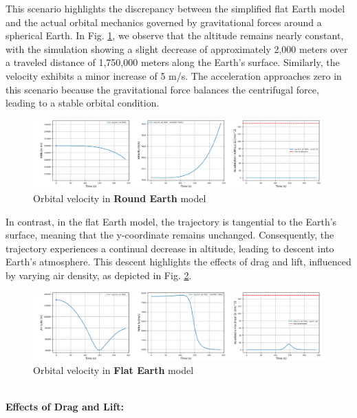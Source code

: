 \documentclass[runningheads]{llncs}
\begin{document}
This scenario highlights the discrepancy between the simplified flat Earth model and the actual orbital mechanics governed by gravitational forces around a spherical Earth. In Fig. \ref{orbit_round_earth}, we observe that the altitude remains nearly constant, with the simulation showing a slight decrease of approximately 2,000 meters over a traveled distance of 1,750,000 meters along the Earth's surface. Similarly, the velocity exhibits a minor increase of 5 m/s. The acceleration approaches zero in this scenario because the gravitational force balances the centrifugal force, leading to a stable orbital condition.


\begin{figure}
\centering
\includegraphics[width=1\textwidth]{images/orbit_round_earth.png}
\caption{Orbital velocity in \textbf{Round Earth} model} \label{orbit_round_earth}
\end{figure}

In contrast, in the flat Earth model, the trajectory is tangential to the Earth's surface, meaning that the y-coordinate remains unchanged. Consequently, the trajectory experiences a continual decrease in altitude, leading to descent into Earth's atmosphere. This descent highlights the effects of drag and lift, influenced by varying air density, as depicted in Fig. \ref{orbit_flat_earth}.

\begin{figure}
\centering
\includegraphics[width=1\textwidth]{images/orbit_flat_earth.png}
\caption{Orbital velocity in \textbf{Flat Earth} model} \label{orbit_flat_earth}
\end{figure}


\textbf{\\Effects of Drag and Lift:\\}
\end{document}
